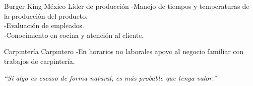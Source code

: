 \documentclass[%
	       doublesided,
	       paper=a4,
	       fontsize=10pt
	      ]{my-resume}
\begin{document}
{Burger King México}
{Líder de producción}
{
-Manejo de tiempos y temperaturas de la producción del producto.\\
-Evaluación de empleados.\\
-Conocimiento en cocina y atención al cliente.
}

{Carpintería}
{Carpintero}
{
-En horarios no laborales apoyo al negocio familiar con trabajos de carpintería.
}

\begin{center}

\vspace{2.5em}
\textit{``Si algo es escaso de forma natural, \newline es más probable que tenga valor.''}                                 %
\end{center}
%
\end{document}
